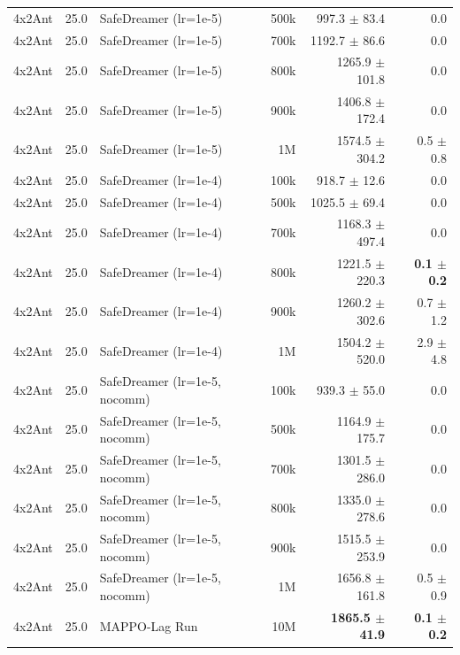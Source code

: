 \begin{longtable}{l r l r r r}
4x2Ant & 25.0 & SafeDreamer (lr=1e-5) & 500k & 997.3 $\pm$ 83.4 & 0.0 \\
4x2Ant & 25.0 & SafeDreamer (lr=1e-5) & 700k & 1192.7 $\pm$ 86.6 & 0.0 \\
4x2Ant & 25.0 & SafeDreamer (lr=1e-5) & 800k & 1265.9 $\pm$ 101.8 & 0.0 \\
4x2Ant & 25.0 & SafeDreamer (lr=1e-5) & 900k & 1406.8 $\pm$ 172.4 & 0.0 \\
4x2Ant & 25.0 & SafeDreamer (lr=1e-5) & 1M & 1574.5 $\pm$ 304.2 & 0.5 $\pm$ 0.8 \\
4x2Ant & 25.0 & SafeDreamer (lr=1e-4) & 100k & 918.7 $\pm$ 12.6 & 0.0 \\
4x2Ant & 25.0 & SafeDreamer (lr=1e-4) & 500k & 1025.5 $\pm$ 69.4 & 0.0 \\
4x2Ant & 25.0 & SafeDreamer (lr=1e-4) & 700k & 1168.3 $\pm$ 497.4 & 0.0 \\
4x2Ant & 25.0 & SafeDreamer (lr=1e-4) & 800k & 1221.5 $\pm$ 220.3 & \textbf{0.1 $\pm$ 0.2} \\
4x2Ant & 25.0 & SafeDreamer (lr=1e-4) & 900k & 1260.2 $\pm$ 302.6 & 0.7 $\pm$ 1.2 \\
4x2Ant & 25.0 & SafeDreamer (lr=1e-4) & 1M & 1504.2 $\pm$ 520.0 & 2.9 $\pm$ 4.8 \\
4x2Ant & 25.0 & SafeDreamer (lr=1e-5, nocomm) & 100k & 939.3 $\pm$ 55.0 & 0.0 \\
4x2Ant & 25.0 & SafeDreamer (lr=1e-5, nocomm) & 500k & 1164.9 $\pm$ 175.7 & 0.0 \\
4x2Ant & 25.0 & SafeDreamer (lr=1e-5, nocomm) & 700k & 1301.5 $\pm$ 286.0 & 0.0 \\
4x2Ant & 25.0 & SafeDreamer (lr=1e-5, nocomm) & 800k & 1335.0 $\pm$ 278.6 & 0.0 \\
4x2Ant & 25.0 & SafeDreamer (lr=1e-5, nocomm) & 900k & 1515.5 $\pm$ 253.9 & 0.0 \\
4x2Ant & 25.0 & SafeDreamer (lr=1e-5, nocomm) & 1M & 1656.8 $\pm$ 161.8 & 0.5 $\pm$ 0.9 \\
4x2Ant & 25.0 & MAPPO-Lag Run & 10M & \textbf{1865.5 $\pm$ 41.9} & \textbf{0.1 $\pm$ 0.2} \\
\end{longtable}

